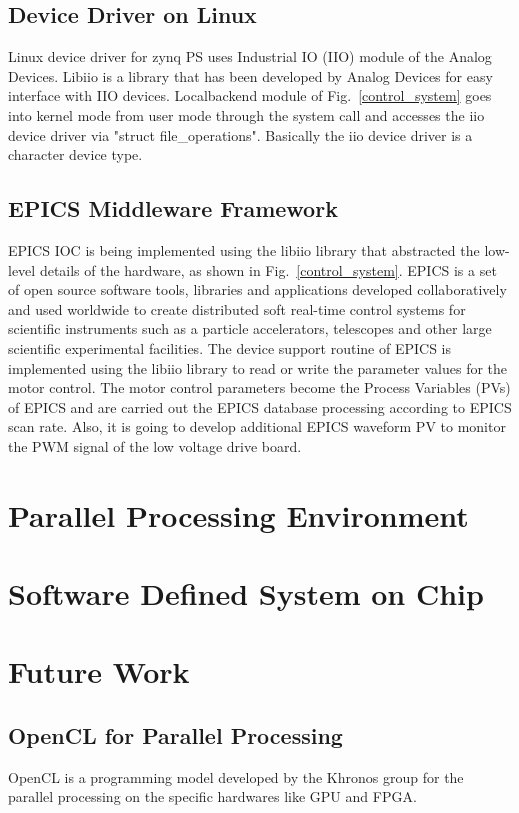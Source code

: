 \documentclass[journal]{IEEEtran}
\begin{document}
\subsection{Device Driver on Linux}
Linux device driver for zynq PS uses Industrial IO (IIO) module of the Analog Devices. Libiio\cite{iio} is a library that has been developed by Analog Devices for easy interface with IIO devices. Localbackend module of Fig.~\ref{control_system} goes into kernel mode from user mode through the system call and accesses the iio device driver via "struct file\_operations". Basically the iio device driver is a character device type.

\subsection{EPICS Middleware Framework}
EPICS IOC is being implemented using the libiio library that abstracted the low-level details of the hardware, as shown in Fig.~\ref{control_system}. EPICS is a set of open source software tools, libraries and applications developed collaboratively and used worldwide to create distributed soft real-time control systems for scientific instruments such as a particle accelerators, telescopes and other large scientific experimental facilities\cite{epics}. The device support routine of EPICS is implemented using the libiio library to read or write the parameter values for the motor control. The motor control parameters become the Process Variables (PVs) of EPICS and are carried out the EPICS database processing according to EPICS scan rate. Also, it is going to develop additional EPICS waveform PV to monitor the PWM signal of the low voltage drive board.


\cleardoublepage
\section{Parallel Processing Environment}


\section{Software Defined System on Chip}


\section{Future Work}
\subsection{OpenCL for Parallel Processing}
OpenCL is a programming model developed by the Khronos group for the parallel processing on the specific hardwares like GPU and FPGA.
\end{document}
